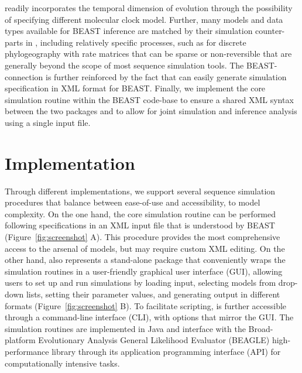 {\bussname} readily 
incorporates the temporal dimension of evolution through the possibility of specifying different molecular clock model.
Further, many models and data types available for BEAST inference are matched by their simulation counter-parts in {\bussname}, including
relatively specific processes, such as for discrete phylogeography with rate matrices that can be sparse or non-reversible \cite{Lemey2009} that are generally beyond the scope of most sequence simulation tools.
The BEAST-{\bussname} connection is further reinforced by the fact that {\bussname} can easily generate simulation specification in XML format for BEAST.
Finally, we implement the core simulation routine within the BEAST code-base to ensure a shared XML syntax between the two packages and to allow for joint simulation and inference analysis using a single input file.

\section{Implementation}

Through different implementations, we support several sequence simulation procedures that balance between ease-of-use and accessibility, to model complexity.
On the one hand, the core simulation routine can be performed following specifications in an XML input file that is understood by BEAST (Figure~\ref{fig:screenshot} A).
This procedure provides the most comprehensive access to the {\bussname} arsenal of models, but may require custom XML editing.
On the other hand, {\bussname} also represents a stand-alone package that conveniently wraps the simulation routines in a user-friendly graphical user interface (GUI), allowing users to set up and run simulations by loading input, selecting models from drop-down lists, setting their parameter values, and generating output in different formats (Figure~\ref{fig:screenshot} B).
To facilitate scripting, {\bussname} is further accessible through a command-line interface (CLI), with options that mirror the GUI.
The simulation routines are implemented in Java and interface with the Broad-platform Evolutionary Analysis General Likelihood Evaluator (BEAGLE) high-performance library \cite{Ayres2012} through its application programming interface (API) for computationally intensive tasks. 

